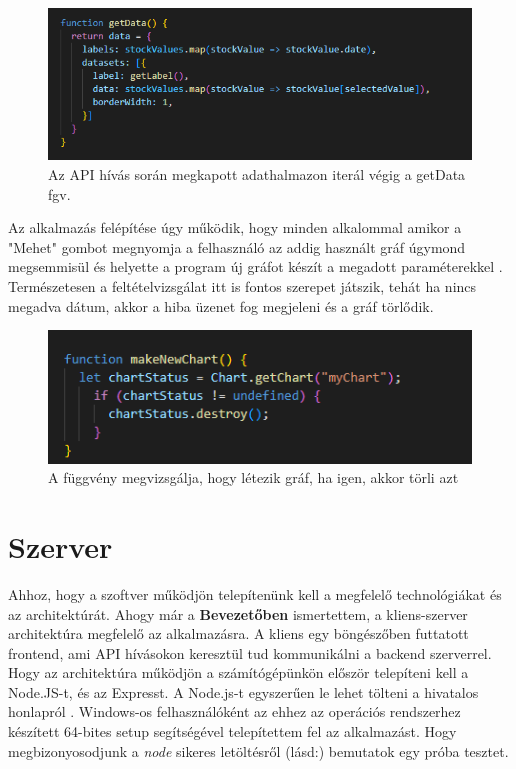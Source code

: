 \begin{figure}[h]
\centering
\includegraphics[scale=0.7]{images/chartData.png}
\caption{Az API hívás során megkapott adathalmazon iterál végig a getData fgv.}
\label{fig:chartData}
\end{figure}

Az alkalmazás felépítése úgy működik, hogy minden alkalommal amikor a "Mehet" gombot megnyomja a felhasználó az addig használt gráf úgymond megsemmisül és helyette a program új gráfot készít a megadott paraméterekkel . Természetesen a feltételvizsgálat itt is fontos szerepet játszik, tehát ha nincs megadva dátum, akkor a hiba üzenet fog megjeleni és a gráf törlődik.

\begin{figure}[h]
\centering
\includegraphics[scale=0.8]{images/makeNew.png}
\caption{A függvény megvizsgálja, hogy létezik gráf, ha igen, akkor törli azt}
\label{fig:newChart}
\end{figure}

\section{Szerver \label{fig:server}}

Ahhoz, hogy a szoftver működjön telepítenünk kell a megfelelő technológiákat és az architektúrát. Ahogy már a \textbf{Bevezetőben} ismertettem, a kliens-szerver architektúra megfelelő az alkalmazásra. A kliens egy böngészőben futtatott frontend, ami API hívásokon keresztül tud kommunikálni a backend szerverrel.
Hogy az architektúra működjön a számítógépünkön először telepíteni kell a Node.JS-t, és az Expresst. A Node.js-t egyszerűen le lehet tölteni a hivatalos honlapról \cite{nodeJS}. Windows-os felhasználóként az ehhez az operációs rendszerhez készített 64-bites setup segítségével telepítettem fel az alkalmazást. Hogy megbizonyosodjunk a \emph{node} sikeres letöltésről (lásd:) bemutatok egy próba tesztet.

